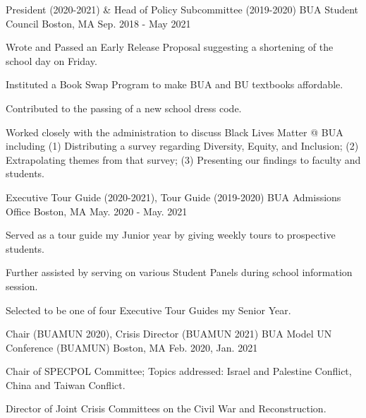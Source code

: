 

\begin{cventries}

  \cventry
    {President (2020-2021) \& Head of Policy Subcommittee (2019-2020)} %
    {BUA Student Council} %
    {Boston, MA} %
    {Sep. 2018 - May 2021} %
    {
      \begin{cvitems} %
        \item {Wrote and Passed an Early Release Proposal suggesting a shortening of the school day on Friday.}
        \item {Instituted a Book Swap Program to make BUA and BU textbooks affordable.}
        \item {Contributed to the passing of a new school dress code.}
        \item {Worked closely with the administration to discuss Black Lives Matter @ BUA including (1) Distributing a survey regarding Diversity, Equity, and Inclusion; (2) Extrapolating themes from that survey; (3) Presenting our findings to faculty and students.}
      \end{cvitems}
    }

  \cventry
    {Executive Tour Guide (2020-2021), Tour Guide (2019-2020)}
    {BUA Admissions Office}
    {Boston, MA}
    {May. 2020 - May. 2021}
    {
     \begin{cvitems}
        \item{Served as a tour guide my Junior year by giving weekly tours to prospective students.}
        \item{Further assisted by serving on various Student Panels during school information session.}
        \item{Selected to be one of four Executive Tour Guides my Senior Year.}
     \end{cvitems}
    }


 \cventry
    {Chair (BUAMUN 2020), Crisis Director (BUAMUN 2021)}
    {BUA Model UN Conference (BUAMUN)}
    {Boston, MA}
    {Feb. 2020, Jan. 2021}
    {
        \begin{cvitems}
            \item {Chair of SPECPOL Committee; Topics addressed: Israel and Palestine Conflict, China and Taiwan Conflict.}
            \item {Director of Joint Crisis Committees on the Civil War and Reconstruction.}
        \end{cvitems}
    }
    

\end{cventries}
